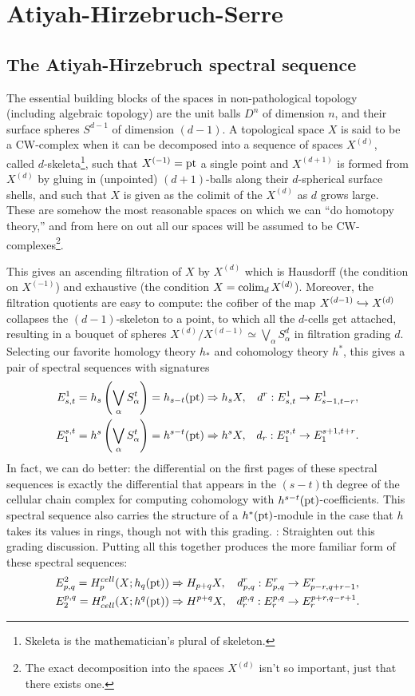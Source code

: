 \chapter{Atiyah-Hirzebruch-Serre}

\section{The Atiyah-Hirzebruch spectral sequence}

The essential building blocks of the spaces in non-pathological topology (including algebraic topology) are the unit balls $D^n$ of dimension $n$, and their surface spheres $S^{d-1}$ of dimension $(d-1)$.  A topological space $X$ is said to be a CW-complex when it can be decomposed into a sequence of spaces $X^{(d)}$, called $d$-skeleta\footnote{Skeleta is the mathematician's plural of skeleton.}, such that $X^{(-1)} = \operatorname{pt}$ a single point and $X^{(d+1)}$ is formed from $X^{(d)}$ by gluing in (unpointed) $(d+1)$-balls along their $d$-spherical surface shells, and such that $X$ is given as the colimit of the $X^{(d)}$ as $d$ grows large.  These are somehow the most reasonable spaces on which we can ``do homotopy theory,'' and from here on out all our spaces will be assumed to be CW-complexes\footnote{The exact decomposition into the spaces $X^{(d)}$ isn't so important, just that there exists one.}.

This gives an ascending filtration of $X$ by $X^{(d)}$ which is Hausdorff (the condition on $X^{(-1)}$) and exhaustive (the condition $X = \operatorname{colim}_d X^{(d)}$).  Moreover, the filtration quotients are easy to compute: the cofiber of the map $X^{(d-1)} \hookrightarrow X^{(d)}$ collapses the $(d-1)$-skeleton to a point, to which all the $d$-cells get attached, resulting in a bouquet of spheres $X^{(d)} / X^{(d-1)} \simeq \bigvee_\alpha S^d_\alpha$ in filtration grading $d$.  Selecting our favorite homology theory $h_*$ and cohomology theory $h^*$, this gives a pair of spectral sequences with signatures
\begin{align*}
E^1_{s, t} = h_s \left(\bigvee_\alpha S^t_\alpha\right) = h_{s-t}(\operatorname{pt}) & \Rightarrow h_s X, & d^r: E^1_{s, t} & \to E^1_{s-1, t-r}, \\
E_1^{s, t} = h^s \left( \bigvee_\alpha S^t_\alpha \right) = h^{s-t}(\operatorname{pt}) & \Rightarrow h^s X, & d_r: E_1^{s, t} & \to E_1^{s+1, t+r}.
\end{align*}
In fact, we can do better: the differential on the first pages of these spectral sequences is exactly the differential that appears in the $(s-t)$th degree of the cellular chain complex for computing cohomology with $h^{s-t}(\operatorname{pt})$-coefficients.  This spectral sequence also carries the structure of a $h^*(\operatorname{pt})$-module in the case that $h$ takes its values in rings, though not with this grading.  \TODO: Straighten out this grading discussion.  Putting all this together produces the more familiar form of these spectral sequences:
\begin{align*}
E^2_{p, q} = H^{cell}_p(X; h_q(\operatorname{pt})) & \Rightarrow H_{p+q} X, & d^r_{p, q}: E^r_{p, q} & \to E^r_{p-r, q+r-1}, \\
E_2^{p, q} = H_{cell}^p(X; h^q(\operatorname{pt})) & \Rightarrow H^{p+q} X, & d_r^{p, q}: E_r^{p, q} & \to E_r^{p+r, q-r+1}.
\end{align*}

